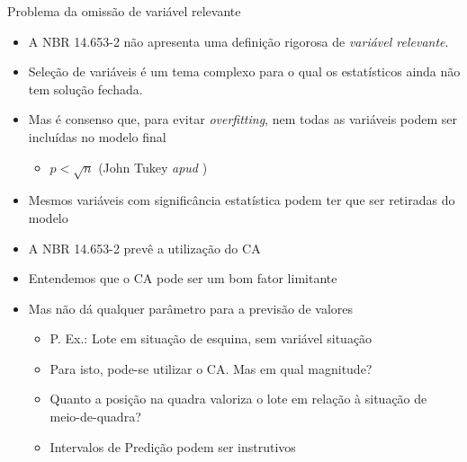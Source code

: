 \documentclass[9pt,ignorenonframetext,aspectratio=169]{beamer}
\providecommand{\tightlist}{%
  \setlength{\itemsep}{0pt}\setlength{\parskip}{0pt}}
\begin{document}
\begin{frame}{Problema da omissão de variável relevante}
\protect\hypertarget{problema-da-omissuxe3o-de-variuxe1vel-relevante}{}

\begin{itemize}[<+->]
\tightlist
\item
  A NBR 14.653-2 não apresenta uma definição rigorosa de \emph{variável 
  relevante}.
\item
  Seleção de variáveis é um tema complexo para o qual os estatísticos
  ainda não tem solução fechada.
\item
  Mas é consenso que, para evitar \emph{overfitting}, nem todas as
  variáveis podem ser incluídas no modelo final

  \begin{itemize}[<+->]
  \tightlist
  \item
    \(p < \sqrt{n}\) (John Tukey \emph{apud} \textcite{matloff2017})
  \end{itemize}
\item
  Mesmos variáveis com significância estatística podem ter que ser
  retiradas do modelo
\item
  A NBR 14.653-2 prevê a utilização do CA
\item
  Entendemos que o CA pode ser um bom fator limitante
\item
  Mas não dá qualquer parâmetro para a previsão de valores

  \begin{itemize}[<+->]
  \tightlist
  \item
    P. Ex.: Lote em situação de esquina, sem variável situação
  \item
    Para isto, pode-se utilizar o CA. Mas em qual magnitude?
  \item
    Quanto a posição na quadra valoriza o lote em relação à situação de
    meio-de-quadra?
  \item
    Intervalos de Predição podem ser instrutivos
  \end{itemize}
\end{itemize}

\end{frame}
\end{document}
